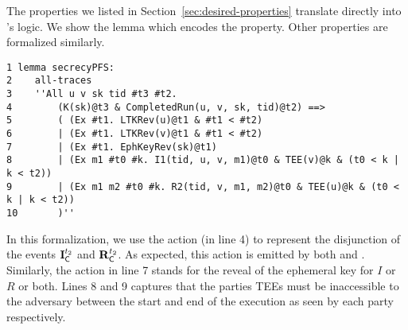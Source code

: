 %

The properties we listed in Section~\ref{sec:desired-properties}
translate directly into \mTamarin's logic.
%
We show the \mTamarin{} lemma which encodes the \mPredPcs{} property.
%
Other properties are formalized similarly. 
%

\begin{small}
\begin{verbatim}
1 lemma secrecyPFS:
2    all-traces
3    ''All u v sk tid #t3 #t2.
4        (K(sk)@t3 & CompletedRun(u, v, sk, tid)@t2) ==>
5        ( (Ex #t1. LTKRev(u)@t1 & #t1 < #t2)
6        | (Ex #t1. LTKRev(v)@t1 & #t1 < #t2)
7        | (Ex #t1. EphKeyRev(sk)@t1)
8        | (Ex m1 #t0 #k. I1(tid, u, v, m1)@t0 & TEE(v)@k & (t0 < k | k < t2))
9        | (Ex m1 m2 #t0 #k. R2(tid, v, m1, m2)@t0 & TEE(u)@k & (t0 < k | k < t2))
10       )''
\end{verbatim}
\end{small}
%

In this formalization, we use the action 
(in line 4) to represent the disjunction of the events $\mathbf{I}_{\textsf{C}}^{t_{2}}$
and $\mathbf{R}_{\textsf{C}}^{t_{2}}$.
%
As expected, this action is emitted by both  and .
%
Similarly, the action  in line 7 stands for the reveal of
the ephemeral key for $I$ or $R$ or both.
%
Lines 8 and 9 captures that the parties TEEs must be inaccessible to the
adversary between the start and end of the execution as seen by each party
respectively.
%
